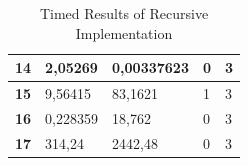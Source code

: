 \documentclass[a4paper]{article}
\begin{document}
\begin{table}[H]
\begin{tabular}{|l|l|l|l|l|}
\textbf{14}     & 2,05269                         & 0,00337623                   & 0                      & 3                  \\ \hline
\textbf{15}     & 9,56415                         & 83,1621                      & 1                      & 3                  \\ \hline
\textbf{16}     & 0,228359                        & 18,762                       & 0                      & 3                  \\ \hline
\textbf{17}     & 314,24                          & 2442,48                      & 0                      & 3                  \\ \hline
\end{tabular}
\caption{Timed Results of Recursive Implementation}
\end{table}
\end{document}
